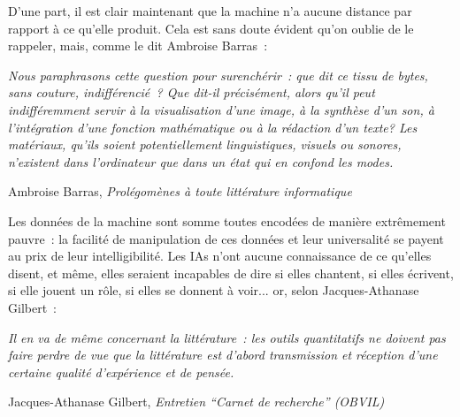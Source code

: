 \documentclass{article}
\newenvironment{citationbox}
{\begin{center}
		\begin{minipage}{.8\textwidth}
		}
		{
		\end{minipage}	
\end{center}
}
\begin{document}
				D'une part, il est clair maintenant que la machine n'a aucune distance par rapport à ce qu'elle produit. Cela est sans doute évident qu'on oublie de le rappeler, mais, comme le dit  Ambroise Barras~:
				\begin{citationbox}
					\textit{Nous paraphrasons cette question pour surenchérir~: que dit ce
						tissu de bytes, sans couture, indifférencié~? Que dit-il précisément, alors
						qu'il peut indifféremment servir à la visualisation d'une image, à la
						synthèse d'un son, à l'intégration d'une fonction mathématique ou à la
						rédaction d'un texte? Les matériaux, qu'ils soient potentiellement
						linguistiques, visuels ou sonores, n'existent dans l'ordinateur que dans
						un état qui en confond les modes.}
					\begin{flushright}
						Ambroise Barras, \textit{Prolégomènes à toute littérature informatique} \cite{barras1995}
					\end{flushright}
				\end{citationbox}
				Les données de la machine sont somme toutes encodées de manière extrêmement pauvre~: la facilité de manipulation de ces données et leur universalité se payent au prix de leur intelligibilité. Les IAs n'ont aucune connaissance de ce qu'elles disent, et même, elles seraient incapables de dire si elles chantent, si elles écrivent, si elle jouent un rôle, si elles se donnent à voir... or, selon Jacques-Athanase Gilbert~:
				\begin{citationbox}
					\textit{Il en va de même concernant la littérature~: les outils quantitatifs ne doivent pas faire perdre de vue que la littérature est d’abord transmission et réception d’une certaine qualité d’expérience et de pensée.}
					\begin{flushright}
						Jacques-Athanase Gilbert, \textit{Entretien ``Carnet de recherche'' (OBVIL)} \cite{gilbert2018}
					\end{flushright}\cite{gilbert2018}
				\end{citationbox}
				
\end{document}
